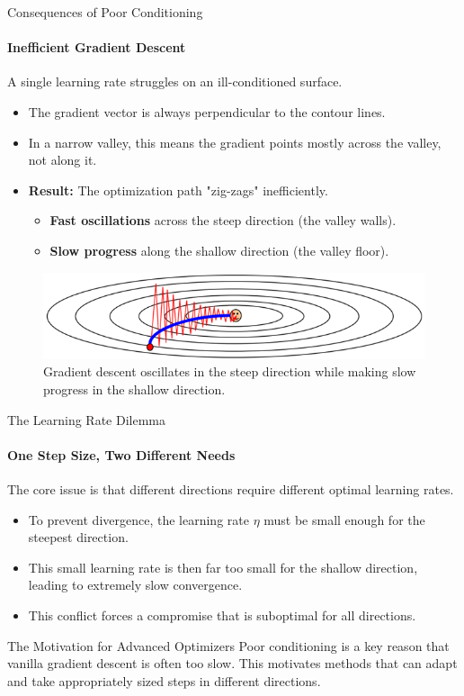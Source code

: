 \begin{frame}{Consequences of Poor Conditioning}
    \framesubtitle{Inefficient Gradient Descent}
    A single learning rate struggles on an ill-conditioned surface.
    \begin{itemize}
        \item The gradient vector is always perpendicular to the contour lines.
        \item In a narrow valley, this means the gradient points mostly across the valley, not along it.
        \item \textbf{Result:} The optimization path "zig-zags" inefficiently.
        \begin{itemize}
            \item \textbf{Fast oscillations} across the steep direction (the valley walls).
            \item \textbf{Slow progress} along the shallow direction (the valley floor).
        \end{itemize}
    \end{itemize}
    \begin{figure}
        \includegraphics[width=1\textwidth]{images/zigzag.png}
        \caption{Gradient descent oscillates in the steep direction while making slow progress in the shallow direction.}
    \end{figure}
\end{frame}

\begin{frame}{The Learning Rate Dilemma}
    \framesubtitle{One Step Size, Two Different Needs}
    The core issue is that different directions require different optimal learning rates.
    \begin{itemize}
        \item To prevent divergence, the learning rate $\eta$ must be small enough for the steepest direction.
        \item This small learning rate is then far too small for the shallow direction, leading to extremely slow convergence.
        \item This conflict forces a compromise that is suboptimal for all directions.
    \end{itemize}
    \begin{alertblock}{The Motivation for Advanced Optimizers}
        Poor conditioning is a key reason that vanilla gradient descent is often too slow. This motivates methods that can adapt and take appropriately sized steps in different directions.
    \end{alertblock}
\end{frame}
